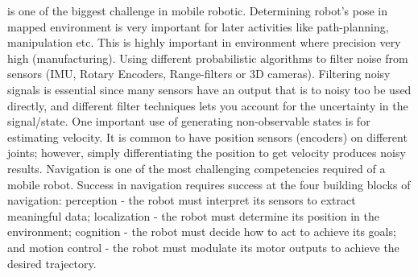 \documentclass[10pt,journal,compsoc]{IEEEtran}
\begin{document}
     is one of the biggest challenge in mobile robotic. Determining robot's pose in mapped environment is very important for later activities like path-planning, manipulation etc. This is highly important in environment where precision very high (manufacturing). Using different probabilistic algorithms to filter noise from sensors (IMU, Rotary Encoders, Range-filters or 3D cameras). Filtering noisy signals is essential since many sensors have an output that is to noisy too be used directly, and different filter techniques lets you account for the uncertainty in the signal/state. One important use of generating non-observable states is for estimating velocity. It is common to have position sensors (encoders) on different joints; however, simply differentiating the position to get velocity produces noisy results. Navigation is one of the most challenging competencies required of a mobile robot. Success
    in navigation requires success at the four building blocks of navigation: perception - the robot must interpret its sensors to extract meaningful data; localization - the robot must determine its position in the environment; cognition - the robot must decide how to act to achieve its goals; and motion control -  the robot must modulate its motor outputs to achieve the desired trajectory.
\end{document}
